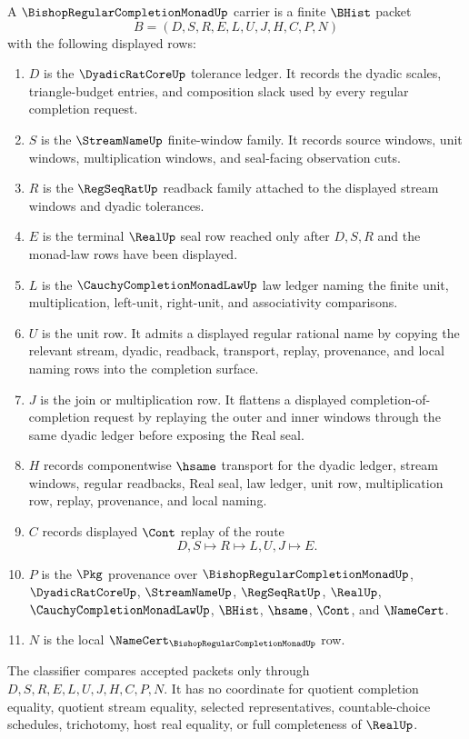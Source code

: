 \begin{definition}
\label{def:bishop-regular-completion-monad-carrier}
A $\BishopRegularCompletionMonadUp$ carrier is a finite $\BHist$ packet
$$
B=(D,S,R,E,L,U,J,H,C,P,N)
$$
with the following displayed rows:
\begin{enumerate}
\item $D$ is the $\DyadicRatCoreUp$ tolerance ledger. It records the dyadic scales, triangle-budget entries, and composition slack used by every regular completion request.
\item $S$ is the $\StreamNameUp$ finite-window family. It records source windows, unit windows, multiplication windows, and seal-facing observation cuts.
\item $R$ is the $\RegSeqRatUp$ readback family attached to the displayed stream windows and dyadic tolerances.
\item $E$ is the terminal $\RealUp$ seal row reached only after $D,S,R$ and the monad-law rows have been displayed.
\item $L$ is the $\CauchyCompletionMonadLawUp$ law ledger naming the finite unit, multiplication, left-unit, right-unit, and associativity comparisons.
\item $U$ is the unit row. It admits a displayed regular rational name by copying the relevant stream, dyadic, readback, transport, replay, provenance, and local naming rows into the completion surface.
\item $J$ is the join or multiplication row. It flattens a displayed completion-of-completion request by replaying the outer and inner windows through the same dyadic ledger before exposing the Real seal.
\item $H$ records componentwise $\hsame$ transport for the dyadic ledger, stream windows, regular readbacks, Real seal, law ledger, unit row, multiplication row, replay, provenance, and local naming.
\item $C$ records displayed $\Cont$ replay of the route
$$
D,S \longmapsto R \longmapsto L,U,J \longmapsto E .
$$
\item $P$ is the $\Pkg$ provenance over $\BishopRegularCompletionMonadUp$, $\DyadicRatCoreUp$, $\StreamNameUp$, $\RegSeqRatUp$, $\RealUp$, $\CauchyCompletionMonadLawUp$, $\BHist$, $\hsame$, $\Cont$, and $\NameCert$.
\item $N$ is the local $\NameCert_{\BishopRegularCompletionMonadUp}$ row.
\end{enumerate}
The classifier compares accepted packets only through $D,S,R,E,L,U,J,H,C,P,N$. It has no coordinate for quotient completion equality, quotient stream equality, selected representatives, countable-choice schedules, trichotomy, host real equality, or full completeness of $\RealUp$.
\end{definition}


